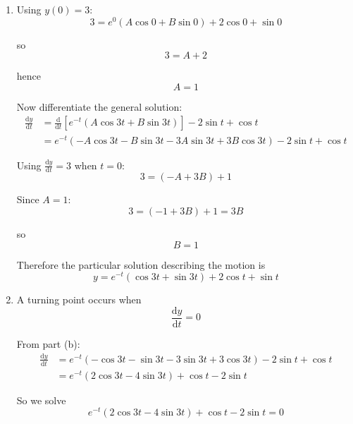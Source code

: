 \documentclass[leqno]{article}
\begin{document}
\begin{enumerate}[
  label=\textbf{\arabic*.},
  leftmargin=*,
  topsep=0pt,
  partopsep=0pt,
  parsep=0pt
]
\begin{djsSolution}
\begin{enumerate}[label=\textbf{(\alph*)}]
Solve these simultaneous equations:
\begin{align*}
9(9C+2D)&=9(20)\\
2(9D-2C)&=2(5)
\end{align*}

so
\begin{align*}
81C+18D&=180\\
-4C+18D&=10
\end{align*}

Subtracting:
\[
85C=170
\]

so
\[
C=2
\]

Substituting into \(9C+2D=20\):
\[
18+2D=20
\]

hence
\[
D=1
\]

Therefore
\[
y_p=2\cos t+\sin t
\]

So the general solution is
\[
y=e^{-t}(A\cos 3t+B\sin 3t)+2\cos t+\sin t
\]

  \item Using \(y(0)=3\):
\[
3=e^0(A\cos 0+B\sin 0)+2\cos 0+\sin 0
\]

so
\[
3=A+2
\]

hence
\[
A=1
\]

Now differentiate the general solution:
\begin{align*}
\frac{\mathrm{d}y}{\mathrm{d}t}
&=\frac{\mathrm{d}}{\mathrm{d}t}\left[e^{-t}(A\cos 3t+B\sin 3t)\right]-2\sin t+\cos t\\
&=e^{-t}(-A\cos 3t-B\sin 3t-3A\sin 3t+3B\cos 3t)-2\sin t+\cos t
\end{align*}

Using \(\frac{\mathrm{d}y}{\mathrm{d}t}=3\) when \(t=0\):
\[
3=(-A+3B)+1
\]

Since \(A=1\):
\[
3=(-1+3B)+1=3B
\]

so
\[
B=1
\]

Therefore the particular solution describing the motion is
\[
y=e^{-t}(\cos 3t+\sin 3t)+2\cos t+\sin t
\]

  \item A turning point occurs when
\[
\frac{\mathrm{d}y}{\mathrm{d}t}=0
\]

From part (b):
\begin{align*}
\frac{\mathrm{d}y}{\mathrm{d}t}
&=e^{-t}(-\cos 3t-\sin 3t-3\sin 3t+3\cos 3t)-2\sin t+\cos t\\
&=e^{-t}(2\cos 3t-4\sin 3t)+\cos t-2\sin t
\end{align*}

So we solve
\[
e^{-t}(2\cos 3t-4\sin 3t)+\cos t-2\sin t=0
\]


\end{enumerate}
\end{djsSolution}
\end{enumerate}
\end{document}
